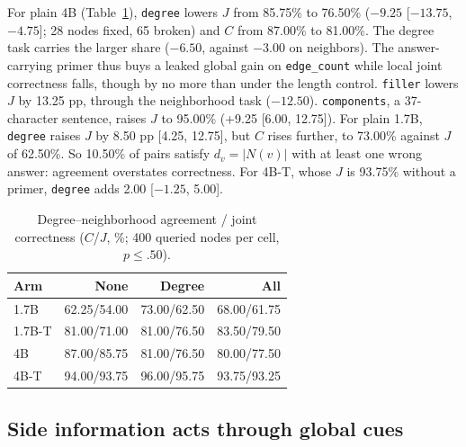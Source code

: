 \documentclass[11pt]{article}
\newcommand{\task}[1]{\texttt{#1}}
\newcommand{\cond}[1]{\texttt{#1}}
\begin{document}
For plain 4B (Table~\ref{tab:cj}), \cond{degree} lowers $J$ from 85.75\% to 76.50\%
($-9.25$ [$-13.75$, $-4.75$]; 28 nodes fixed, 65 broken) and $C$ from
87.00\% to 81.00\%. The degree task carries the larger share ($-6.50$,
against $-3.00$ on neighbors). The answer-carrying primer thus buys a leaked
global gain on \task{edge\_count} while local joint correctness falls,
though by no more than under the length control. \cond{filler} lowers $J$
by 13.25 pp, through the neighborhood task ($-12.50$). \cond{components}, a
37-character sentence, raises $J$ to 95.00\% (+9.25 [6.00, 12.75]). For
plain 1.7B, \cond{degree} raises $J$ by 8.50 pp [4.25, 12.75], but $C$ rises
further, to 73.00\% against $J$ of 62.50\%. So 10.50\% of pairs satisfy
$d_v{=}|N(v)|$ with at least one wrong answer: agreement overstates
correctness. For 4B-T, whose $J$ is 93.75\% without a primer, \cond{degree}
adds 2.00 [$-1.25$, 5.00].

\begin{table}[t]
\centering
\small
\begin{tabular}{lrrr}
\toprule
Arm & None & Degree & All \\
\midrule
1.7B   & 62.25/54.00 & 73.00/62.50 & 68.00/61.75 \\
1.7B-T & 81.00/71.00 & 81.00/76.50 & 83.50/79.50 \\
4B     & 87.00/85.75 & 81.00/76.50 & 80.00/77.50 \\
4B-T   & 94.00/93.75 & 96.00/95.75 & 93.75/93.25 \\
\bottomrule
\end{tabular}
\caption{Degree--neighborhood agreement / joint correctness ($C$/$J$, \%;
400 queried nodes per cell, $p\le.50$).}
\label{tab:cj}
\end{table}

\subsection{Side information acts through global cues}
\label{sec:side}
\end{document}
